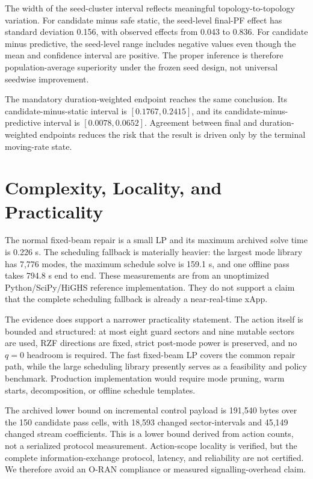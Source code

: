 \documentclass[journal]{IEEEtran}
\begin{document}
The width of the seed-cluster interval reflects meaningful topology-to-topology variation. For candidate minus safe static, the seed-level final-PF effect has standard deviation 0.156, with observed effects from 0.043 to 0.836. For candidate minus predictive, the seed-level range includes negative values even though the mean and confidence interval are positive. The proper inference is therefore population-average superiority under the frozen seed design, not universal seedwise improvement.

The mandatory duration-weighted endpoint reaches the same conclusion. Its candidate-minus-static interval is $[0.1767,0.2415]$, and its candidate-minus-predictive interval is $[0.0078,0.0652]$. Agreement between final and duration-weighted endpoints reduces the risk that the result is driven only by the terminal moving-rate state.

\section{Complexity, Locality, and Practicality}


The normal fixed-beam repair is a small LP and its maximum archived solve time is 0.226 s. The scheduling fallback is materially heavier: the largest mode library has 7,776 modes, the maximum schedule solve is 159.1 s, and one offline pass takes 794.8 s end to end. These measurements are from an unoptimized Python/SciPy/HiGHS reference implementation. They do not support a claim that the complete scheduling fallback is already a near-real-time xApp.

The evidence does support a narrower practicality statement. The action itself is bounded and structured: at most eight guard sectors and nine mutable sectors are used, RZF directions are fixed, strict post-mode power is preserved, and no $q=0$ headroom is required. The fast fixed-beam LP covers the common repair path, while the large scheduling library presently serves as a feasibility and policy benchmark. Production implementation would require mode pruning, warm starts, decomposition, or offline schedule templates.

The archived lower bound on incremental control payload is 191,540 bytes over the 150 candidate pass cells, with 18,593 changed sector-intervals and 45,149 changed stream coefficients. This is a lower bound derived from action counts, not a serialized protocol measurement. Action-scope locality is verified, but the complete information-exchange protocol, latency, and reliability are not certified. We therefore avoid an O-RAN compliance or measured signalling-overhead claim.
\end{document}
